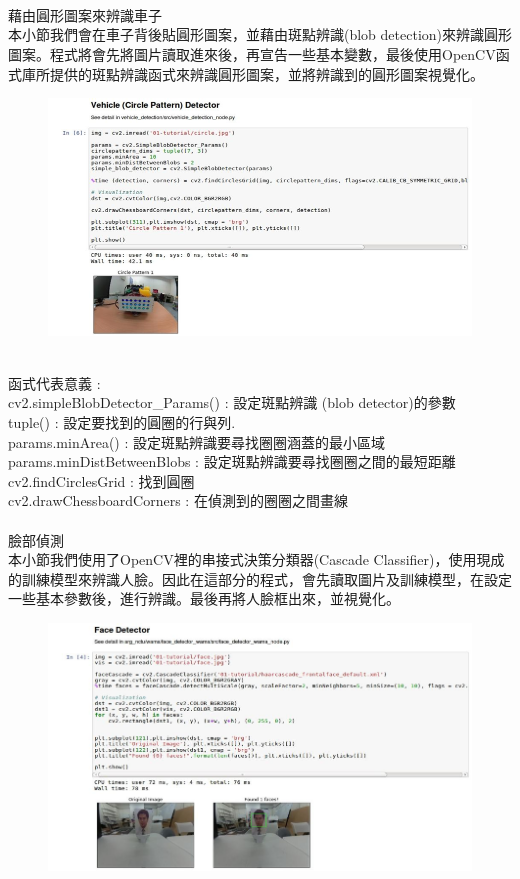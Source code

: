 \documentclass{article}
\begin{document}
\\
\\\\藉由圓形圖案來辨識車子
\\本小節我們會在車子背後貼圓形圖案，並藉由斑點辨識(blob detection)來辨識圓形圖案。程式將會先將圖片讀取進來後，再宣告一些基本變數，最後使用OpenCV函式庫所提供的斑點辨識函式來辨識圓形圖案，並將辨識到的圓形圖案視覺化。
\
\begin{figure}[htp]
    \begin{center}
        \includegraphics[width=330pt]{pic/5_1_3.png}
    \end{center}
\end{figure}
\\
函式代表意義 : 
\\cv2.simpleBlobDetector\_Params()	: 設定斑點辨識 (blob detector)的參數  
\\tuple()						: 設定要找到的圓圈的行與列.
\\params.minArea() 				: 設定斑點辨識要尋找圈圈涵蓋的最小區域
\\params.minDistBetweenBlobs 	: 設定斑點辨識要尋找圈圈之間的最短距離
\\cv2.findCirclesGrid 				: 找到圓圈
\\cv2.drawChessboardCorners 		: 在偵測到的圈圈之間畫線
\\\\臉部偵測
\\本小節我們使用了OpenCV裡的串接式決策分類器(Cascade Classifier)，使用現成的訓練模型來辨識人臉。因此在這部分的程式，會先讀取圖片及訓練模型，在設定一些基本參數後，進行辨識。最後再將人臉框出來，並視覺化。
\
\begin{figure}[htp]
    \begin{center}
        \includegraphics[width=400pt]{pic/5_1_4.png}
    \end{center}
\end{figure}
\end{document}
